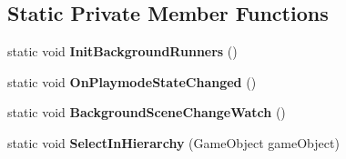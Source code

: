 \subsection*{Static Private Member Functions}
\begin{DoxyCompactItemize}
\item 
\mbox{\label{class_unity_test_1_1_integration_tests_runner_window_a1b982d8befddaa590c41170520e0a700}} 
static void {\bfseries Init\+Background\+Runners} ()
\item 
\mbox{\label{class_unity_test_1_1_integration_tests_runner_window_a6a63ff0b2c1de596ef2da21a4813fb0b}} 
static void {\bfseries On\+Playmode\+State\+Changed} ()
\item 
\mbox{\label{class_unity_test_1_1_integration_tests_runner_window_a300b78c488af73e89d2d970efd97b967}} 
static void {\bfseries Background\+Scene\+Change\+Watch} ()
\item 
\mbox{\label{class_unity_test_1_1_integration_tests_runner_window_af1329cad462bbc589c655988dbeead79}} 
static void {\bfseries Select\+In\+Hierarchy} (Game\+Object game\+Object)
\end{DoxyCompactItemize}
